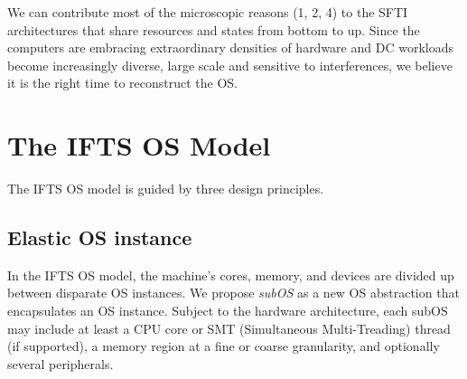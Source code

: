 \documentclass[pageno]{jpaper}
\begin{document}
We can contribute most of the microscopic reasons (1, 2, 4) to the SFTI architectures that share resources and states from bottom to up.
Since the computers are embracing extraordinary densities of hardware and DC workloads become increasingly  diverse, large scale and sensitive to interferences, we believe it is the right time to reconstruct the OS.
 




\section{The IFTS OS Model}\label{section_os_model}














The IFTS OS model is guided by three design principles.
























\subsection{Elastic OS instance}



In the IFTS OS model, the machine's cores,
memory, and devices are divided up between disparate OS instances.  We propose \emph{subOS} as a new OS abstraction that encapsulates an OS instance.
     Subject to the hardware architecture, each subOS may include at least a CPU core or SMT (Simultaneous Multi-Treading) thread (if supported), a memory region at a fine or coarse granularity, and optionally several peripherals.
\end{document}
